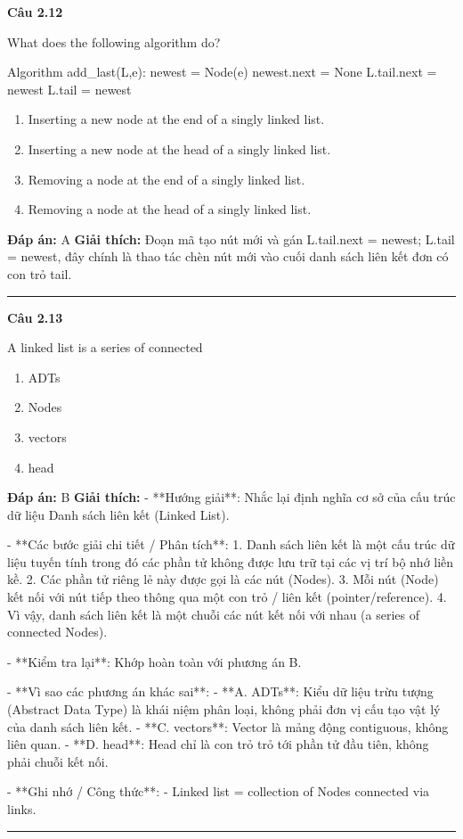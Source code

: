 \documentclass[11pt,a4paper]{article}
\newenvironment{question}[1]{%
  \par\vspace{1em}\noindent\textbf{\large Câu #1}\par\vspace{0.4em}
}{%
  \par\vspace{1em}\hrule\vspace{0.6em}
}
\newenvironment{choices}{%
  \begin{enumerate}[label=\textbf{\Alph*.},leftmargin=2.2em,itemsep=2pt,topsep=3pt]
}{%
  \end{enumerate}
}
\newcommand{\choice}{\item}
\newenvironment{codebox}{%
  \begin{tcolorbox}[colback=gray!8!white,colframe=gray!50!black,arc=1.5mm,boxrule=0.6pt,left=3mm,right=3mm,top=2.5mm,bottom=2.5mm]
  \ttfamily\small
}{%
  \end{tcolorbox}
}
\begin{document}
\begin{question}{2.12}
What does the following algorithm do?
\begin{codebox}
Algorithm add_last(L,e):
newest = Node(e)
newest.next = None
L.tail.next = newest
L.tail = newest
\end{codebox}
\begin{choices}
\choice Inserting a new node at the end of a singly linked list.
\choice Inserting a new node at the head of a singly linked list.
\choice Removing a node at the end of a singly linked list.
\choice Removing a node at the head of a singly linked list.
\end{choices}
\textbf{Đáp án:} A
\textbf{Giải thích:} Đoạn mã tạo nút mới và gán L.tail.next = newest; L.tail = newest, đây chính là thao tác chèn nút mới vào cuối danh sách liên kết đơn có con trỏ tail.
\end{question}

\begin{question}{2.13}
A linked list is a series of connected
\begin{choices}
\choice ADTs
\choice Nodes
\choice vectors
\choice head
\end{choices}
\textbf{Đáp án:} B
\textbf{Giải thích:} - **Hướng giải**:
  Nhắc lại định nghĩa cơ sở của cấu trúc dữ liệu Danh sách liên kết (Linked List).

- **Các bước giải chi tiết / Phân tích**:
  1. Danh sách liên kết là một cấu trúc dữ liệu tuyến tính trong đó các phần tử không được lưu trữ tại các vị trí bộ nhớ liền kề.
  2. Các phần tử riêng lẻ này được gọi là các nút (Nodes).
  3. Mỗi nút (Node) kết nối với nút tiếp theo thông qua một con trỏ / liên kết (pointer/reference).
  4. Vì vậy, danh sách liên kết là một chuỗi các nút kết nối với nhau (a series of connected Nodes).

- **Kiểm tra lại**:
  Khớp hoàn toàn với phương án B.

- **Vì sao các phương án khác sai**:
  - **A. ADTs**: Kiểu dữ liệu trừu tượng (Abstract Data Type) là khái niệm phân loại, không phải đơn vị cấu tạo vật lý của danh sách liên kết.
  - **C. vectors**: Vector là mảng động contiguous, không liên quan.
  - **D. head**: Head chỉ là con trỏ trỏ tới phần tử đầu tiên, không phải chuỗi kết nối.

- **Ghi nhớ / Công thức**:
  - Linked list = collection of Nodes connected via links.
\end{question}
\end{document}
